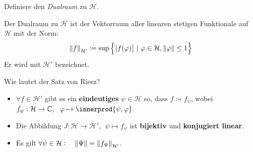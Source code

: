 \documentclass[9pt]{article}
\newcommand{\C}[1]{%
	\ifthenelse{\equal{#1}{}}
	{\mathbb{C}}
	{\mathbb{C}^{#1}}}%
\DeclarePairedDelimiter{\innerprod}\langle\rangle
\newcommand{\Hi}{\mathcal{H}}
\newenvironment{field}{}{\newpage}
\newif\ifnote
\newenvironment{note}{\notetrue}{\notefalse}
\newcommand{\localtag}{}
\newcommand{\globaltag}{}
\newcommand{\uuid}{}
\newcommand{\tags}[1]{
    \ifnote 
        \renewcommand{\localtag}{#1}
    \else
        \renewcommand{\globaltag}{#1}
    \fi 
    }
\newcommand{\xplain}[1]{\renewcommand{\uuid}{#1}}
\begin{document}
	\begin{note}
		\xplain{51c21e76-0b2c-472a-86c2-845e67a1b33b}
		\tags{definition, satz, dualraum, 5.2.17, 5.2.18}
		
		\begin{field}  %
			Definiere den \textit{Dualraum} zu $\Hi$.
		\end{field}
		
		\begin{field}  %
			Der Dualraum zu $\Hi$ ist der Vektorraum aller linearen stetigen Funktionale auf $\Hi$
			mit der Norm:
			\begin{equation*}
				\norm{f}_{\Hi'} \coloneqq \sup\qty{\abs{f(\varphi)} \ | \ \varphi \in \Hi, \norm{\varphi}\leq 1}
			\end{equation*}
			Er wird mit $\Hi'$ bezeichnet. 
		\end{field}
		
	\begin{field}  %
		Wie lautet der Satz von Riesz?
	\end{field}
	
	\begin{field}  %
		\begin{itemize}
			\item $\forall f \in \Hi'$ gibt es ein \textbf{eindeutiges} $\psi \in \Hi$ so, dass
			$f \coloneqq f_\psi$, wobei $f_\psi :\Hi \rightarrow \C{}, \ \ \varphi \mapsto \innerprod{\psi,\varphi}$.
			\item Die Abbildung $J : \Hi \rightarrow \Hi', \ \ \psi \mapsto f_\psi$ ist \textbf{bijektiv} und \textbf{konjugiert linear}.
			\item Es gilt $\forall \psi \in \Hi: \quad \norm{\Psi} = \norm{f_\Psi}_{\Hi'}$.
		\end{itemize}
	\end{field}
	\end{note}
	
\end{document}
